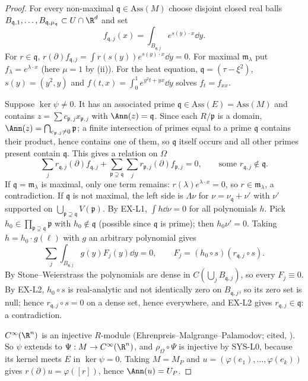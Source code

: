 \begin{proof}
For every non-maximal $\mathfrak q\in\mathrm{Ass}(M)$ choose disjoint closed real balls $B_{\mathfrak q,1},\dots,B_{\mathfrak q,\mu_{\mathfrak q}}\subset U\cap\R^d$ and set
\[
f_{\mathfrak q,j}(x)=\int_{B_{\mathfrak q,j}}e^{s(y)\cdot x}\dd y .
\]
For $r\in\mathfrak q$, $r(\partial)f_{\mathfrak q,j}=\int r(s(y))e^{s(y)\cdot x}\dd y=0$. For maximal $\mathfrak m_\lambda$ put $f_\lambda=e^{\lambda\cdot x}$ (here $\mu=1$ by (ii)). For the heat equation, $\mathfrak q=(\tau-\xi^2)$, $s(y)=(y^2,y)$ and $f(t,x)=\int_0^1e^{y^2t+yx}\dd y$ solves $f_t=f_{xx}$.

Suppose $\ker\psi\ne0$. It has an associated prime $\mathfrak q\in\mathrm{Ass}(E)=\mathrm{Ass}(M)$ and contains $z=\sum c_{\mathfrak p,j}x_{\mathfrak p,j}$ with $\Ann(z)=\mathfrak q$. Since each $R/\mathfrak p$ is a domain, $\Ann(z)=\bigcap_{c_{\mathfrak p,j}\ne0}\mathfrak p$; a finite intersection of primes equal to a prime $\mathfrak q$ contains their product, hence contains one of them, so $\mathfrak q$ itself occurs and all other primes present contain $\mathfrak q$. This gives a relation on $\Omega$
\[
\sum_jr_{\mathfrak q,j}(\partial)f_{\mathfrak q,j}+\sum_{\mathfrak p\supsetneq\mathfrak q}\sum_jr_{\mathfrak p,j}(\partial)f_{\mathfrak p,j}=0,\qquad\text{some }r_{\mathfrak q,j}\notin\mathfrak q .
\]
If $\mathfrak q=\mathfrak m_\lambda$ is maximal, only one term remains: $r(\lambda)e^{\lambda\cdot x}=0$, so $r\in\mathfrak m_\lambda$, a contradiction. If $\mathfrak q$ is not maximal, the left side is $\Lambda\nu$ for $\nu=\nu_{\mathfrak q}+\nu'$ with $\nu'$ supported on $\bigcup_{\mathfrak p\supsetneq\mathfrak q}V(\mathfrak p)$. By EX-L1, $\int h\dd\nu=0$ for all polynomials $h$. Pick $h_0\in\prod_{\mathfrak p\supsetneq\mathfrak q}\mathfrak p$ with $h_0\notin\mathfrak q$ (possible since $\mathfrak q$ is prime); then $h_0\nu'=0$. Taking $h=h_0\cdot g(\ell)$ with $g$ an arbitrary polynomial gives
\[
\sum_j\int_{B_{\mathfrak q,j}}g(y)F_j(y)\dd y=0,\qquad F_j=(h_0\circ s)(r_{\mathfrak q,j}\circ s).
\]
By Stone--Weierstrass the polynomials are dense in $C(\bigcup_jB_{\mathfrak q,j})$, so every $F_j\equiv0$. By EX-L2, $h_0\circ s$ is real-analytic and not identically zero on $B_{\mathfrak q,j}$, so its zero set is null; hence $r_{\mathfrak q,j}\circ s=0$ on a dense set, hence everywhere, and EX-L2 gives $r_{\mathfrak q,j}\in\mathfrak q$: a contradiction.

$C^\infty(\R^n)$ is an injective $R$-module (Ehrenpreis--Malgrange--Palamodov; cited, \cf). So $\psi$ extends to $\Psi:M\to C^\infty(\R^n)$, and $\rho_\Omega\circ\Psi$ is injective by SYS-L0, because its kernel meets $E$ in $\ker\psi=0$. Taking $M=M_P$ and $u=(\varphi(e_1),\dots,\varphi(e_k))$ gives $r(\partial)u=\varphi([r])$, hence $\Ann(u)=U_P$.

\end{proof}

